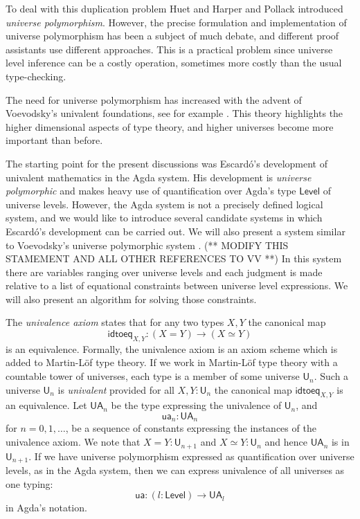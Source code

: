 \documentclass[11pt,a4paper]{article}
\def\UU{\mathsf{U}}
\def\Level{\mathsf{Level}}
\newcommand{\idtoeq}{\mathsf{idtoeq}}
\newcommand{\ua}{\mathsf{ua}}
\newcommand{\UA}{\mathsf{UA}}
\begin{document}
To deal with this duplication problem Huet \cite{Huet87} and Harper and Pollack \cite{HarperP91} introduced {\em universe polymorphism}. However, the precise formulation and implementation of universe polymorphism has been a subject of much debate, and different proof assistants use different approaches. This is a practical problem since universe level inference can be a costly operation, sometimes more costly than the usual type-checking.

The need for universe polymorphism has increased with the advent of Voevodsky's univalent foundations, see for example \cite{VV}. This theory highlights the higher dimensional aspects of type theory, and higher universes become more important than before.

The starting point for the present discussions was Escard\'o's \cite{escardo} development of univalent mathematics in the Agda system. His development is {\em universe polymorphic} and makes heavy use of quantification over Agda's type $\Level$ of universe levels. However, the Agda system is not a precisely defined logical system, and we would like to introduce several candidate systems in which Escard\'o's development can be carried out. We will also present a system similar to Voevodsky's universe polymorphic system \cite{VV}. (** MODIFY THIS STAMEMENT AND ALL OTHER REFERENCES TO VV **) In this system there are variables ranging over universe levels and each judgment is made relative to a list of equational constraints between universe level expressions. We will also present an algorithm for solving those constraints.


The {\em univalence axiom} states that for any two types $X,Y$ the canonical map
$$
\idtoeq_{X,Y} : (X=Y)\to (X\simeq Y)
$$
is an equivalence. Formally, the univalence axiom is an axiom scheme which is added to Martin-Löf type theory. If we work in Martin-Löf type theory with a countable tower of universes, each type is a member of some universe $\UU_n$. Such a universe $\UU_n$ is {\em univalent} provided for all $X,Y : \UU_n$ the canonical map $\idtoeq_{X,Y}$ is an equivalence. Let $\UA_n$ be the type expressing the univalence of $\UU_n$, and
$$
\ua_n : \UA_n
$$
for $n = 0,1,\ldots$, be a sequence of constants expressing the instances of the univalence axiom. We note that $X = Y : \UU_{n+1}$ and $X\simeq Y : \UU_n$ and hence $\UA_n$ is in $\UU_{n+1}$. If we have universe polymorphism expressed as quantification over universe levels, as in the Agda system, then we can express univalence of all universes as one typing:
$$
\ua : (l : \Level) \to \UA_l
$$
in Agda's notation.
\end{document}
